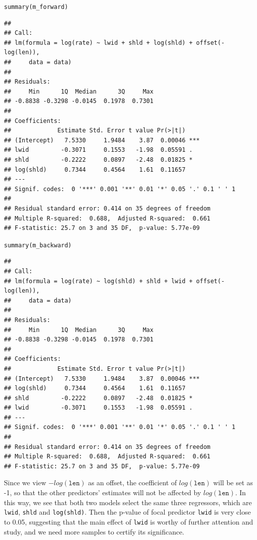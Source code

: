 \documentclass[12pt,oneside,a4paper]{article}\usepackage[]{graphicx}\usepackage[]{xcolor}
\makeatletter
\newcommand{\hlstd}[1]{\textcolor[rgb]{0,0,0}{#1}}%
\newcommand{\hlkwd}[1]{\textcolor[rgb]{0,0,0}{#1}}%
\newenvironment{kframe}{%
 \def\at@end@of@kframe{}%
 \ifinner\ifhmode%
  \def\at@end@of@kframe{\end{minipage}}%
  \begin{minipage}{\columnwidth}%
 \fi\fi%
 \def\FrameCommand##1{\hskip\@totalleftmargin \hskip-\fboxsep
 \colorbox{shadecolor}{##1}\hskip-\fboxsep
     \hskip-\linewidth \hskip-\@totalleftmargin \hskip\columnwidth}%
 \MakeFramed {\advance\hsize-\width
   \@totalleftmargin\z@ \linewidth\hsize
   \@setminipage}}%
 {\par\unskip\endMakeFramed%
 \at@end@of@kframe}
\newenvironment{knitrout}{}{} %
\newcommand{\m}[1]{\texttt{{#1}}}
\makeatother
\begin{document}
\begin{knitrout}
\begin{kframe}
\begin{alltt}
\hlkwd{summary}\hlstd{(m_forward)}
\end{alltt}
\begin{verbatim}
## 
## Call:
## lm(formula = log(rate) ~ lwid + shld + log(shld) + offset(-log(len)), 
##     data = data)
## 
## Residuals:
##     Min      1Q  Median      3Q     Max 
## -0.8838 -0.3298 -0.0145  0.1978  0.7301 
## 
## Coefficients:
##             Estimate Std. Error t value Pr(>|t|)    
## (Intercept)   7.5330     1.9484    3.87  0.00046 ***
## lwid         -0.3071     0.1553   -1.98  0.05591 .  
## shld         -0.2222     0.0897   -2.48  0.01825 *  
## log(shld)     0.7344     0.4564    1.61  0.11657    
## ---
## Signif. codes:  0 '***' 0.001 '**' 0.01 '*' 0.05 '.' 0.1 ' ' 1
## 
## Residual standard error: 0.414 on 35 degrees of freedom
## Multiple R-squared:  0.688,	Adjusted R-squared:  0.661 
## F-statistic: 25.7 on 3 and 35 DF,  p-value: 5.77e-09
\end{verbatim}
\begin{alltt}
\hlkwd{summary}\hlstd{(m_backward)}
\end{alltt}
\begin{verbatim}
## 
## Call:
## lm(formula = log(rate) ~ log(shld) + shld + lwid + offset(-log(len)), 
##     data = data)
## 
## Residuals:
##     Min      1Q  Median      3Q     Max 
## -0.8838 -0.3298 -0.0145  0.1978  0.7301 
## 
## Coefficients:
##             Estimate Std. Error t value Pr(>|t|)    
## (Intercept)   7.5330     1.9484    3.87  0.00046 ***
## log(shld)     0.7344     0.4564    1.61  0.11657    
## shld         -0.2222     0.0897   -2.48  0.01825 *  
## lwid         -0.3071     0.1553   -1.98  0.05591 .  
## ---
## Signif. codes:  0 '***' 0.001 '**' 0.01 '*' 0.05 '.' 0.1 ' ' 1
## 
## Residual standard error: 0.414 on 35 degrees of freedom
## Multiple R-squared:  0.688,	Adjusted R-squared:  0.661 
## F-statistic: 25.7 on 3 and 35 DF,  p-value: 5.77e-09
\end{verbatim}
\end{kframe}
\end{knitrout}

Since we view $-log(\m{len})$ as an offset, the coefficient of $log(\m{len})$ will be set as -1, so that the other predictors' estimates will not be affected by $log(\m{len})$. In this way, we see that both two models select the same three regressors, which are \m{lwid}, \m{shld} and \m{log(shld)}. Then the p-value of focal predictor \m{lwid} is very close to 0.05, suggesting that the main effect of \m{lwid} is worthy of further attention and study, and we need more samples to certify its significance.
\end{document}
